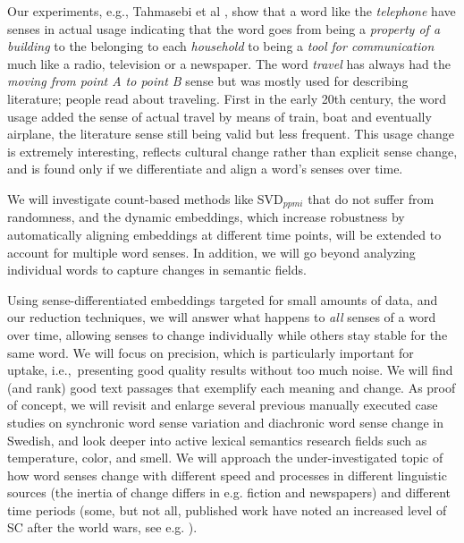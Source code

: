 \documentclass[12pt,twoside,a4paper]{article}
\newcommand\ie{{i.e.,\ }}
\begin{document}
        Our experiments, e.g., Tahmasebi et al \citeyearpar{Tahmasebi-RANLP2017},  show that a word like the \textit{telephone} have senses in actual usage indicating that the word goes from being a \textit{property of a building} to the belonging to each \textit{household} to being a \textit{tool for communication} much like a radio, television or a newspaper. The word \textit{travel} has always had the \textit{moving from point A to point B} sense but was mostly used for describing literature; people read about traveling. First in the early 20th century, the word usage added the sense of actual travel by means of train, boat and eventually airplane, the literature sense still being valid but less frequent. This usage change is extremely interesting, reflects cultural change rather than explicit sense change, and is found only if we differentiate and align a word's senses over time. 
        
            We will investigate count-based methods like SVD$_{ppmi}$ \citep{DiachronicWordEmb} that do not suffer from randomness, and the dynamic embeddings, which increase robustness by automatically aligning embeddings at different time points, will be extended to account for multiple word senses. In addition, we will go beyond analyzing individual words to capture changes in semantic fields. 
	
	Using sense-differ\-en\-tiated embeddings targeted for small amounts of data, and our reduction techniques, we will answer what happens to \textit{all} senses of a word over time, allowing senses to change individually while others  stay stable for the same word.
	We will focus on precision, which is particularly important for uptake, \ie presenting good quality results without too much noise. We will find (and rank) good text passages that exemplify each meaning and change. 
    As proof of concept, we will revisit and enlarge several previous manually executed case studies on synchronic word sense variation and diachronic word sense change in Swedish, and look deeper into active lexical semantics research fields such as temperature, color, and smell. We will approach the under-investigated topic of how word senses change with different speed and processes in different linguistic sources (the inertia of change differs in e.g. fiction and newspapers) and different time periods (some, but not all, published work have noted an increased level of SC after the world wars, see e.g. \cite{juola_time_2003-a} ). 
% 
% 
    
\end{document}
